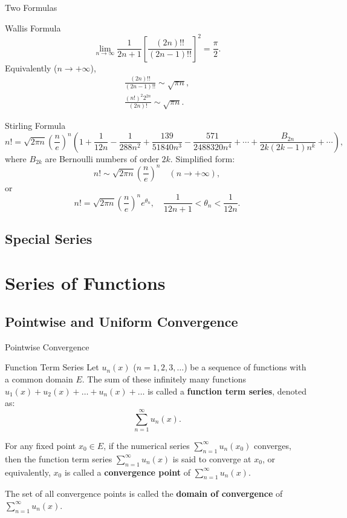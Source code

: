\documentclass[11pt]{../../TexTemplate/elegantbook}
\begin{document}
\begin{leftbarTitle}{Two Formulas}\end{leftbarTitle}
\begin{theorem}{Wallis Formula}
    \[
    \lim_{n \to \infty} \frac{1}{2n+1} \left[ \frac{(2n)!!}{(2n-1)!!} \right]^{2}  = \frac{\pi}{2}.
    \]
    Equivalently (\(n\to +\infty\)),
    \begin{gather*}
        \frac{(2n)!!}{(2n-1)!!} \sim \sqrt{\pi n}, \\
        \frac{(n!)^{2}2^{2n}}{(2n)!} \sim \sqrt{\pi n}.
    \end{gather*}
\end{theorem}


\begin{theorem}{Stirling Formula}
    \[
    n! = \sqrt{2\pi n} \left( \frac{n}{e} \right)^n 
    \left( 1 + \frac{1}{12n} - \frac{1}{288n^2} + \frac{139}{51840n^3} - \frac{571}{2488320n^4} + \cdots 
    + \frac{B_{2n}}{2k(2k-1) n^{k}} + \cdots  \right),
    \]
    where \( B_{2k} \) are Bernoulli numbers of order \( 2k \).
    Simplified form:
    \[
    n! \sim \sqrt{2\pi n} \left( \frac{n}{e} \right)^{n} \quad (n \to +\infty),
    \]
    or
    \[
    n! = \sqrt{2\pi n} \left( \frac{n}{e} \right)^{n} e^{\theta_n}, \quad \frac{1}{12n+1} < \theta_n < \frac{1}{12n}.
    \]
\end{theorem}


\section{Special Series}

\chapter{Series of Functions}
\section{Pointwise and Uniform Convergence}
\begin{leftbarTitle}{Pointwise Convergence}\end{leftbarTitle}
\begin{definition}{Function Term Series}
    Let \( u_n(x) \) (\( n = 1, 2, 3, \dots \)) be a sequence of functions with a common domain \( E \). 
    The sum of these infinitely many functions \( u_1(x) + u_2(x) + \dots + u_n(x) + \dots \) 
    is called a \textbf{function term series}, denoted as:
    \[
    \sum_{n=1}^{\infty} u_n(x).
    \]

    For any fixed point \( x_0 \in E \), if the numerical series \( \sum_{n=1}^{\infty} u_n(x_0) \) converges, 
    then the function term series \( \sum_{n=1}^{\infty} u_n(x) \) is said to 
    converge at \( x_0 \), or equivalently, \( x_0 \) is called 
    a \textbf{convergence point} of \( \sum_{n=1}^{\infty} u_n(x) \).

    The set of all convergence points is called the \textbf{domain of convergence} of \( \sum_{n=1}^{\infty} u_n(x) \).
\end{definition}
\end{document}
